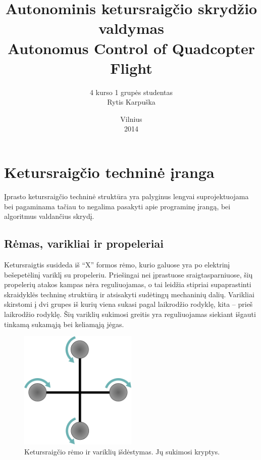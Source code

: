 \documentclass[12pt, a4paper, lithuanian, final]{article}
\title{Autonominis ketursraigčio skrydžio valdymas\\Autonomus Control of Quadcopter Flight}
\author{
    4 kurso 1 grupės studentas \\
    Rytis Karpuška
}
\date{Vilnius \\
	2014}
\begin{document}
\maketitle
\tableofcontents






\section{Ketursraigčio techninė įranga}
Įprasto ketursraigčio techninė struktūra yra palyginus lengvai suprojektuojama bei pagaminama tačiau to negalima pasakyti apie programinę įrangą, bei algoritmus valdančius skrydį.



\subsection{Rėmas, varikliai ir propeleriai}
Ketursraigtis susideda iš "`X"' formos rėmo, kurio galuose yra po elektrinį bešepetėlinį variklį su propeleriu.
Priešingai nei įprastuose sraigtasparniuose, šių propelerių atakos kampas nėra reguliuojamas, o tai leidžia stipriai supaprastinti skraidyklės techninę struktūrą ir atsisakyti sudėtingų mechaninių dalių.
Varikliai skirstomi į dvi grupes iš kurių viena sukasi pagal laikrodžio rodyklę, kita -- prieš laikrodžio rodyklę.
Šių variklių sukimosi greitis yra reguliuojamas siekiant išgauti tinkamą sukamąją bei keliamąją jėgas.

\begin{figure}[H]
\begin{center}
\includegraphics[width=0.5\textwidth]{img/rotor-direction.png}
\caption{Ketursraigčio rėmo ir variklių išdėstymas. Jų sukimosi kryptys.}
\end{center}
\end{figure}
\end{document}
